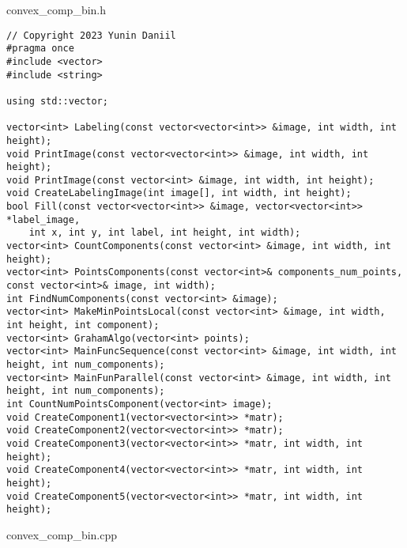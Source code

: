 \documentclass{report}
\begin{document}
convex\_comp\_bin.h
\begin{lstlisting}
// Copyright 2023 Yunin Daniil
#pragma once
#include <vector>
#include <string>

using std::vector;

vector<int> Labeling(const vector<vector<int>> &image, int width, int height);
void PrintImage(const vector<vector<int>> &image, int width, int height);
void PrintImage(const vector<int> &image, int width, int height);
void CreateLabelingImage(int image[], int width, int height);
bool Fill(const vector<vector<int>> &image, vector<vector<int>> *label_image,
    int x, int y, int label, int height, int width);
vector<int> CountComponents(const vector<int> &image, int width, int height);
vector<int> PointsComponents(const vector<int>& components_num_points, const vector<int>& image, int width);
int FindNumComponents(const vector<int> &image);
vector<int> MakeMinPointsLocal(const vector<int> &image, int width, int height, int component);
vector<int> GrahamAlgo(vector<int> points);
vector<int> MainFuncSequence(const vector<int> &image, int width, int height, int num_components);
vector<int> MainFunParallel(const vector<int> &image, int width, int height, int num_components);
int CountNumPointsComponent(vector<int> image);
void CreateComponent1(vector<vector<int>> *matr);
void CreateComponent2(vector<vector<int>> *matr);
void CreateComponent3(vector<vector<int>> *matr, int width, int height);
void CreateComponent4(vector<vector<int>> *matr, int width, int height);
void CreateComponent5(vector<vector<int>> *matr, int width, int height);

\end{lstlisting}
convex\_comp\_bin.cpp
\end{document}
